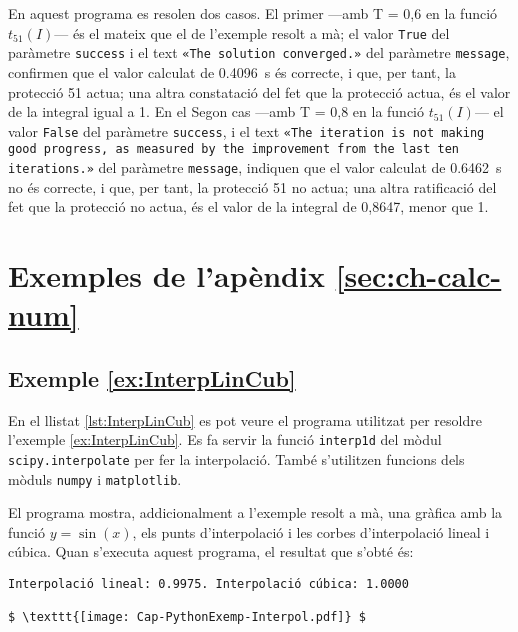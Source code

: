 En aquest programa es resolen dos casos. El primer ---amb  T = 0,6 en la funció $t_{51}(I)$--- és el mateix que el de l'exemple resolt a mà; el valor \texttt{True} del paràmetre \texttt{success} i el text  \texttt{«The solution converged.»} del paràmetre \texttt{message}, confirmen que el valor calculat de \qty{0,4096}{s} és correcte, i que, per tant, la protecció 51 actua; una altra constatació del fet que la protecció actua, és el valor de la integral igual a 1. En el Segon cas ---amb T = 0,8 en la funció $t_{51}(I)$--- el valor \texttt{False} del paràmetre \texttt{success}, i el text  \texttt{«The iteration is not making good progress, as measured by the improvement from the last ten iterations.»} del paràmetre \texttt{message}, indiquen que el valor calculat de \qty{0,6462}{s} no és correcte, i que, per tant, la protecció 51 no actua; una altra ratificació del fet que la protecció no actua, és el valor de la integral de 0,8647, menor que 1. 


\section{Exemples de l'apèndix \ref*{sec:ch-calc-num}}

\hypertarget{exemple:InterpLinCub}{\subsection{Exemple \ref*{ex:InterpLinCub} \InterpLinCub}}
En el llistat \vref{lst:InterpLinCub} es pot veure el programa utilitzat per resoldre l'exemple \vref{ex:InterpLinCub}. Es fa servir la funció \texttt{interp1d} del mòdul \texttt{scipy.interpolate} per fer la interpolació. També s'utilitzen funcions dels mòduls \texttt{numpy} i  \texttt{matplotlib}.




El programa mostra, addicionalment a l'exemple resolt a mà, una gràfica amb la funció $y=\sin(x)$, els punts d'interpolació i les corbes d'interpolació lineal i cúbica. 
Quan s'executa aquest programa, el resultat que s'obté és:
\lstset{
	language=,
	numbers=none,
	frame=none
}
\begin{lstlisting}[mathescape=true]
Interpolació lineal: 0.9975. Interpolació cúbica: 1.0000

$ \texttt{[image: Cap-PythonExemp-Interpol.pdf]} $
\end{lstlisting} 


